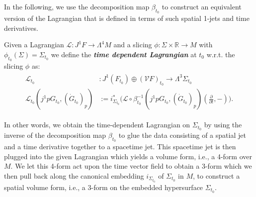 In the following, we use the decomposition map $\beta_{t_0}$ to construct an equivalent version of the Lagrangian that is defined in terms of such spatial 1-jets and time derivatives. 
\begin{definition}
Given a Lagrangian $\mathcal{L} : J^1F \rightarrow \Lambda^4M$ and a slicing $\phi : \Sigma \times \mathbb{R} \rightarrow M$ with $\phi_{t_0}(\Sigma) = \Sigma_{t_0}$ we define the \textbf{\textit{time dependent Lagrangian}} at $t_0$ w.r.t. the slicing $\phi$ as:
\begin{align}
\begin{aligned}
    \mathcal{L}_{t_0} &: J^1(F_{t_0}) \oplus (\mathcal{V}F)_{t_0} \longrightarrow \Lambda^3\Sigma_{t_0}\\
    \mathcal{L}_{t_0}(j^1pG_{t_0}, (\dot{G}_{t_0})_p) &:= i_{\Sigma_{t_0}}^{\ast} \bigl( \mathcal{L}\circ \beta_{t_0}^{-1}(j^1pG_{t_0}, (\dot{G}_{t_0})_p)(\frac{\partial}{\partial t},-)\bigr). 
\end{aligned}
\end{align}
\end{definition}

In other words, we obtain the time-dependent Lagrangian on $\Sigma_{t_0}$ by using the inverse of the decomposition map $\beta_{t_0}$ to glue the data consisting of a spatial jet and a time derivative together to a spacetime jet. This spacetime jet is then plugged into the given Lagrangian which yields a volume form, i.e., a 4-form over $M$. We let this 4-form act upon the time vector field to obtain a 3-form which we then pull back along the canonical embedding $i_{\Sigma_{t_0}}$ of $\Sigma_{t_0}$ in $M$, to construct a spatial volume form, i.e., a 3-form on the embedded hypersurface $\Sigma_{t_0}$. 

